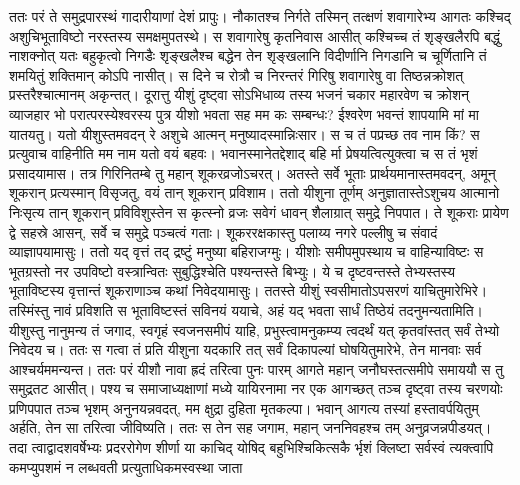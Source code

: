 \adhyAya
{}
\vakya ततः परं ते समुद्रपारस्थं गादारीयाणां देशं प्रापुः।
\vakya नौकातश्च निर्गते तस्मिन् तत्क्षणं शवागारेभ्य आगतः कश्चिद् अशुचिभूताविष्टो नरस्तस्य समक्षमुपतस्थे।
\vakya स शवागारेषु कृतनिवास आसीत् कश्चिच्च तं शृङ्खलैरपि बद्धुं नाशक्नोत्
\vakya यतः बहुकृत्वो निगडैः शृङ्खलैश्च बद्धेन तेन शृङ्खलानि विदीर्णानि निगडानि च चूर्णितानि तं शमयितुं शक्तिमान् कोऽपि नासीत्।
\vakya स दिने च रोत्रौ च निरन्तरं गिरिषु शवागारेषु वा तिष्ठन्नक्रोशत् प्रस्तरैश्चात्मानम् अकृन्तत्।
\vakya दूरात्तु यीशुं दृष्ट्वा सोऽभिधाव्य तस्य भजनं चकार महारवेण च क्रोशन् व्याजहार
\vakya भो परात्परस्येश्वरस्य पुत्र यीशो भवता सह मम कः सम्बन्धः? ईश्वरेण भवन्तं शापयामि मां मा यातयतु।
\vakya यतो यीशुस्तमवदन् रे अशुचे आत्मन् मनुष्यादस्मान्निःसार।
\vakya स च तं पप्रच्छ तव नाम किं? स प्रत्युवाच वाहिनीति मम नाम यतो वयं बहवः।
\vakya भवानस्मानेतद्देशाद् बहि र्मा प्रेषयत्वित्युक्त्वा च स तं भृशं प्रसादयामास।
\vakya तत्र गिरिनितम्बे तु महान् शूकरव्रजोऽचरत्।
\vakya अतस्ते सर्वे भूताः प्रार्थयमानास्तमवदन्, अमून् शूकरान् प्रत्यस्मान् विसृजतु, वयं तान् शूकरान् प्रविशाम।
\vakya ततो यीशुना तूर्णम् अनुज्ञातास्तेऽशुचय आत्मानो निःसृत्य तान् शूकरान् प्रविविशुस्तेन स कृत्स्नो व्रजः सवेगं धावन् शैलाग्रात् समुद्रे निपपात। ते शूकराः प्रायेण द्वे सहस्रे आसन्, सर्वे च समुद्रे पञ्चत्वं गताः।
\vakya शूकररक्षकास्तु पलाय्य नगरे पल्लीषु च संवादं व्याज्ञापयामासुः। ततो यद् वृत्तं तद् द्रष्टुं मनुष्या बहिराजग्मुः।
\vakya यीशोः समीपमुपस्थाय च वाहिन्याविष्टः स भूतग्रस्तो नर उपविष्टो वस्त्रान्वितः सुबुद्धिश्चेति पश्यन्तस्ते बिभ्युः।
\vakya ये च दृष्टवन्तस्ते तेभ्यस्तस्य भूताविष्टस्य वृत्तान्तं शूकराणाञ्च कथां निवेदयामासुः।
\vakya ततस्ते यीशुं स्वसीमातोऽपसरणं याचितुमारेभिरे।
\vakya तस्मिंस्तु नावं प्रविशति स भूताविष्टस्तं सविनयं ययाचे, अहं यद् भवता सार्धं तिष्ठेयं तदनुमन्यतामिति।
\vakya यीशुस्तु नानुमन्य तं जगाद, स्वगृहं स्वजनसमीपं याहि, प्रभुस्त्वामनुकम्प्य त्वदर्थं यत् कृतवांस्तत् सर्वं तेभ्यो निवेदय च।
\vakya ततः स गत्वा तं प्रति यीशुना यदकारि तत् सर्वं दिकापल्यां घोषयितुमारेभे, तेन मानवाः सर्व आश्चर्यममन्यन्त।
\vakya ततः परं यीशौ नावा ह्रदं तरित्वा पुनः पारम् आगते महान् जनौघस्तत्समीपे समाययौ स तु समुद्रतट आसीत्।
\vakya पश्य च समाजाध्यक्षाणां मध्ये यायिरनामा नर एक आगच्छत् तञ्च दृष्ट्वा तस्य चरणयोः प्रणिपपात तञ्च भृशम् अनुनयन्नवदत्,
\vakya मम क्षुद्रा दुहिता मृतकल्पा। भवान् आगत्य तस्यां हस्तावर्पयितुम् अर्हति, तेन सा तरित्वा जीविष्यति।
\vakya ततः स तेन सह जगाम, महान् जननिवहश्च तम् अनुव्रजन्नपीडयत्।
\vakya तदा त्वाद्वादशवर्षेभ्यः प्रदररोगेण शीर्णा या काचिद् योषिद्
\vakya बहुभिश्चिकित्सकै र्भृशं क्लिष्टा सर्वस्वं त्यक्त्वापि कमप्युपशमं न लब्धवती प्रत्युताधिकमस्वस्था जाता
